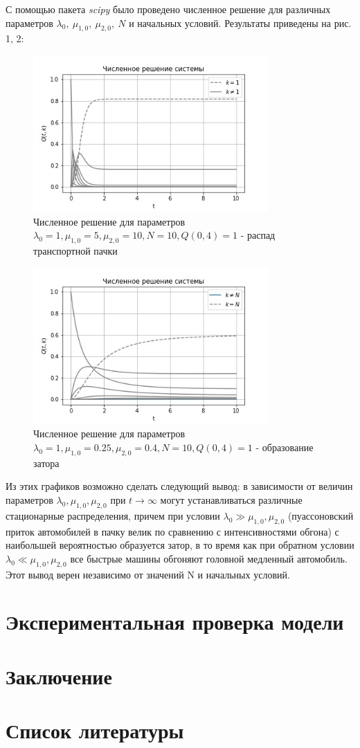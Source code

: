 \documentclass[a4paper, 14pt, russian]{article}
\begin{document}
С помощью пакета \textit{scipy} было проведено численное решение для различных параметров $\lambda_0, \ \mu_{1,0}, \ \mu_{2,0}, \ N$ и начальных условий. Результаты приведены на рис. 1, 2:

\begin{figure}[!ht]
\includegraphics[width=0.8\textwidth]{pictures/1.jpg}
\caption{Численное решение для параметров $\lambda_0 = 1, \mu_{1,0} = 5, \mu_{2,0} = 10, N = 10, Q(0, 4) = 1$ - распад транспортной пачки}
\centering
\end{figure}

\begin{figure}[!ht]
\includegraphics[width=0.8\textwidth]{pictures/2.jpg}
\caption{Численное решение для параметров $\lambda_0 = 1, \mu_{1,0} = 0.25, \mu_{2,0} = 0.4, N = 10, Q(0, 4) = 1$ - образование затора}
\centering
\end{figure}

Из этих графиков возможно сделать следующий вывод: в зависимости от величин параметров $\lambda_0, \mu_{1,0}, \mu_{2,0}$ при $t \rightarrow \infty$ могут устанавливаться различные стационарные распределения, причем при условии $\lambda_0 \gg \mu_{1,0}, \mu_{2,0}$ (пуассоновский приток автомобилей в пачку велик по сравнению с интенсивностями обгона) с наибольшей вероятностью образуется затор, в то время как при обратном условии $\lambda_0 \ll \mu_{1,0}, \mu_{2,0}$ все быстрые машины обгоняют головной медленный автомобиль. Этот вывод верен независимо от значений N и начальных условий.
\section{Экспериментальная проверка модели}

\section{Заключение}

\section{Список литературы}
\end{document}
